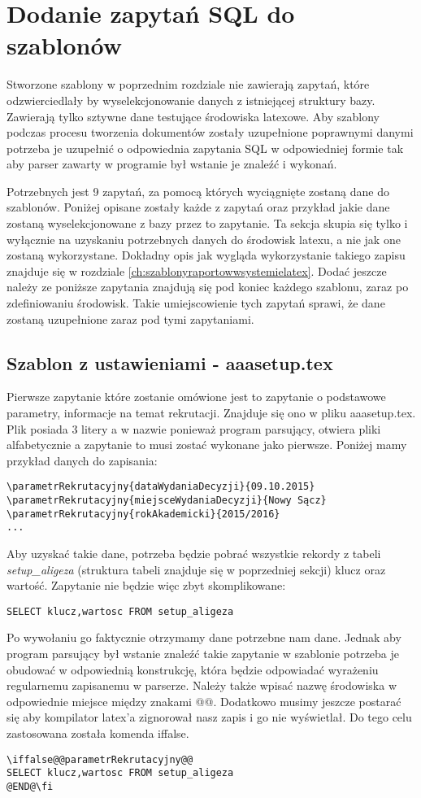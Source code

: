 \section{Dodanie zapytań SQL do szablonów}

Stworzone szablony w poprzednim rozdziale nie zawierają zapytań, które odzwierciedlały by wyselekcjonowanie danych z istniejącej struktury bazy. Zawierają tylko sztywne dane testujące środowiska latexowe. Aby szablony podczas procesu tworzenia dokumentów zostały uzupełnione poprawnymi danymi potrzeba je uzupełnić o odpowiednia zapytania SQL w odpowiedniej formie tak aby parser zawarty w programie był wstanie je znaleźć i wykonań.
\par 
Potrzebnych jest 9 zapytań, za pomocą których wyciągnięte zostaną dane do szablonów. Poniżej opisane zostały każde z zapytań oraz przykład jakie dane zostaną wyselekcjonowane z bazy przez to zapytanie. Ta sekcja skupia się tylko i wyłącznie na uzyskaniu potrzebnych danych do środowisk latexu, a nie jak one zostaną wykorzystane. Dokładny opis jak wygląda wykorzystanie takiego zapisu znajduje się w rozdziale \ref{ch:szablonyraportowwsystemielatex}. Dodać jeszcze należy ze poniższe zapytania znajdują się pod koniec każdego szablonu, zaraz po zdefiniowaniu środowisk. Takie umiejscowienie tych zapytań sprawi, że dane zostaną uzupełnione zaraz pod tymi zapytaniami.
\par 
\subsection*{Szablon z ustawieniami - aaasetup.tex}
Pierwsze zapytanie które zostanie omówione jest to  zapytanie o podstawowe parametry, informacje na temat rekrutacji. Znajduje się ono w pliku aaasetup.tex. Plik posiada 3 litery a w nazwie ponieważ program parsujący, otwiera pliki alfabetycznie a zapytanie to musi zostać wykonane jako pierwsze.  Poniżej mamy przykład danych do zapisania:
 \begin{lstlisting}
\parametrRekrutacyjny{dataWydaniaDecyzji}{09.10.2015}
\parametrRekrutacyjny{miejsceWydaniaDecyzji}{Nowy Sącz}
\parametrRekrutacyjny{rokAkademicki}{2015/2016}
...
\end{lstlisting}
Aby uzyskać takie dane, potrzeba będzie pobrać wszystkie rekordy z tabeli \emph{setup\_aligeza} (struktura tabeli znajduje się w poprzedniej sekcji) klucz oraz wartość. Zapytanie nie będzie więc zbyt skomplikowane:
 \begin{lstlisting}
SELECT klucz,wartosc FROM setup_aligeza
\end{lstlisting}
Po wywołaniu go faktycznie otrzymamy dane potrzebne nam dane. Jednak aby program parsujący był wstanie znaleźć takie zapytanie w szablonie potrzeba je obudować w odpowiednią konstrukcję, która będzie odpowiadać wyrażeniu regularnemu zapisanemu w parserze. Należy także wpisać nazwę środowiska w odpowiednie miejsce między znakami @@. Dodatkowo musimy jeszcze postarać się aby kompilator latex'a zignorował nasz zapis i go nie wyświetlał. Do tego celu zastosowana została komenda iffalse.
 \begin{lstlisting}
\iffalse@@parametrRekrutacyjny@@
SELECT klucz,wartosc FROM setup_aligeza
@END@\fi
\end{lstlisting}
